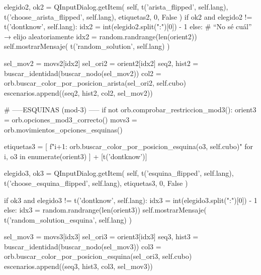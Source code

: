                         elegido2, ok2 = QInputDialog.getItem(
                            self,
                            t('arista_flipped', self.lang),
                            t('choose_arista_flipped', self.lang),
                            etiquetas2,
                            0, False
                        )
                        if ok2 and elegido2 != t('dontknow', self.lang):
                            idx2 = int(elegido2.split(":")[0]) - 1
                        else:
                            # “No sé cuál” → elijo aleatoriamente
                            idx2 = random.randrange(len(orient2))
                            self.mostrarMensaje(
                                t('random_solution', self.lang)
                            )
                            
                        sel_mov2 = movs2[idx2]
                        sel_ori2 = orient2[idx2]
                        seq2, hist2 = buscar_identidad(buscar_nodo(sel_mov2))
                        col2 = orb.buscar_color_por_posicion_arista(sel_ori2, self.cubo)
                        escenarios.append((seq2, hist2, col2, sel_mov2))

                # -----ESQUINAS (mod-3) -----
                if not orb.comprobar_restriccion_mod3():
                    orient3 = orb.opciones_mod3_correcto()  
                    movs3   = orb.movimientos_opciones_esquinas() 

                    etiquetas3 = [
                            f"{i+1}: {orb.buscar_color_por_posicion_esquina(o3, self.cubo)}"
                            for i, o3 in enumerate(orient3)
                        ] + [t('dontknow')]
                    
                    elegido3, ok3 = QInputDialog.getItem(
                            self, t('esquina_flipped', self.lang),
                            t('choose_esquina_flipped', self.lang),
                            etiquetas3, 0, False
                        )

                    if ok3 and elegido3 != t('dontknow', self.lang):
                        idx3 = int(elegido3.split(":")[0]) - 1
                    else:
                        idx3 = random.randrange(len(orient3))
                        self.mostrarMensaje(
                            t('random_solution_esquina', self.lang)
                        )
                        
                    sel_mov3 = movs3[idx3]
                    sel_ori3 = orient3[idx3]
                    seq3, hist3 = buscar_identidad(buscar_nodo(sel_mov3))
                    col3 = orb.buscar_color_por_posicion_esquina(sel_ori3, self.cubo)
                    escenarios.append((seq3, hist3, col3, sel_mov3))

